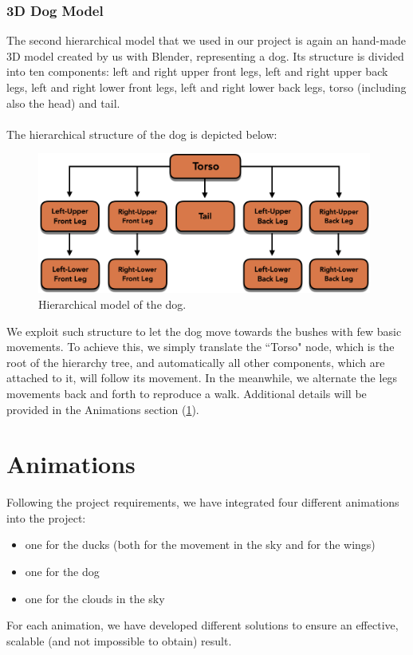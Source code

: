 \documentclass[12pt,a4paper]{article}
\begin{document}
	\subsubsection{3D Dog Model}
	The second hierarchical model that we used in our project is again an hand-made 3D model created by us with Blender, representing a dog. Its structure is divided into ten components: left and right upper front legs, left and right upper back legs, left and right lower front legs, left and right lower back legs, torso (including also the head) and tail. 
	\\\\The hierarchical structure of the dog is depicted below: 
	\begin{figure}[hbt!]
		\centering
		\includegraphics[width=0.98\textwidth]{hier_dog}
		\caption{Hierarchical model of the dog.}
		\label{fig3}
	\end{figure}
	\hfill \break We exploit such structure to let the dog move towards the bushes with few basic movements. To achieve this, we simply translate the ``Torso" node, which is the root of the hierarchy tree, and automatically all other components, which are attached to it, will follow its movement. In the meanwhile, we alternate the legs movements back and forth to reproduce a walk. Additional details will be provided in the Animations section (\ref{anim}).
	
	\section{Animations}\label{anim}
	Following the project requirements, we have integrated four different animations into the project:
	\begin{itemize}
		\item one for the ducks (both for the movement in the sky and for the wings)
		\item one for the dog
		\item one for the clouds in the sky
	\end{itemize}
	For each animation, we have developed different solutions to ensure an effective, scalable (and not impossible to obtain) result.	
\end{document}
